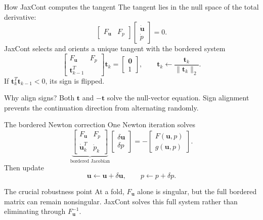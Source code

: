 \documentclass[aspectratio=169,10pt]{beamer}
\newcommand{\state}{\bm{u}}
\newcommand{\tangent}{\bm{t}}
\begin{document}
\begin{frame}{How JaxCont computes the tangent}
The tangent lies in the null space of the total derivative:
\[
  \begin{bmatrix}F_{\state} & F_p\end{bmatrix}
  \begin{bmatrix}\dot{\state}\\ \dot p\end{bmatrix}=0.
\]
JaxCont selects and orients a unique tangent with the bordered system
\[
\begin{bmatrix}
F_{\state} & F_p\\
\tangent_{k-1}^{T}
\end{bmatrix}
\tangent_k=
\begin{bmatrix}\bm{0}\\1\end{bmatrix},
\qquad
\tangent_k\leftarrow\frac{\tangent_k}{\|\tangent_k\|_2}.
\]
If $\tangent_k^T\tangent_{k-1}<0$, its sign is flipped.
\begin{block}{Why align signs?}
Both $\tangent$ and $-\tangent$ solve the null-vector equation. Sign alignment prevents the continuation direction from alternating randomly.
\end{block}
\end{frame}

\begin{frame}{The bordered Newton correction}
One Newton iteration solves
\[
\underbrace{\begin{bmatrix}
F_{\state} & F_p\\
\dot{\state}_k^T & \dot p_k
\end{bmatrix}}_{\text{bordered Jacobian}}
\begin{bmatrix}\delta\state\\\delta p\end{bmatrix}
=-
\begin{bmatrix}F(\state,p)\\g(\state,p)\end{bmatrix}.
\]
Then update
\[
  \state\leftarrow\state+\delta\state,
  \qquad p\leftarrow p+\delta p.
\]
\begin{alertblock}{The crucial robustness point}
At a fold, $F_{\state}$ alone is singular, but the full bordered matrix can remain nonsingular. JaxCont solves this full system rather than eliminating through $F_{\state}^{-1}$.
\end{alertblock}
\end{frame}
\end{document}
